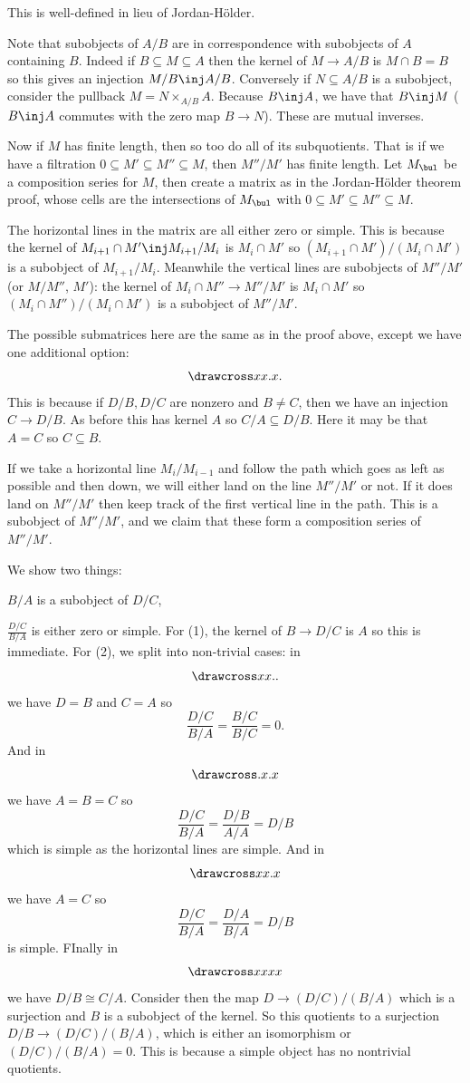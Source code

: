     This is well-defined in lieu of Jordan-H\"older.

\edefn


Note that subobjects of $A/B$ are in correspondence with subobjects of $A$ containing $B$.
Indeed if $B\subseteq M\subseteq A$ then the kernel of $M\to A/B$ is $M\cap B=B$ so this gives an injection $M/B\inj A/B$.
Conversely if $N\subseteq A/B$ is a subobject, consider the pullback $M=N\times_{A/B}A$.
Because $B\inj A$, we have that $B\inj M$ ($B\inj A$ commutes with the zero map $B\to N$).
These are mutual inverses.

Now if $M$ has finite length, then so too do all of its subquotients.
That is if we have a filtration $0\subseteq M'\subseteq M''\subseteq M$, then $M''/M'$ has finite length.
Let $M_\bul$ be a composition series for $M$, then create a matrix as in the Jordan-H\"older theorem proof, whose cells are the intersections of $M_\bul$ with $0\subseteq M'\subseteq M''\subseteq M$.

The horizontal lines in the matrix are all either zero or simple.
This is because the kernel of $M_{i+1}\cap M'\inj M_{i+1}/M_i$ is $M_i\cap M'$ so $(M_{i+1}\cap M')/(M_i\cap M')$ is a subobject of $M_{i+1}/M_i$.
Meanwhile the vertical lines are subobjects of $M''/M'$ (or $M/M''$, $M'$): the kernel of $M_i\cap M''\to M''/M'$ is $M_i\cap M'$ so $(M_i\cap M'')/(M_i\cap M')$ is a subobject of $M''/M'$.

The possible submatrices here are the same as in the proof above, except we have one additional option:
$$ \drawcross xx.x . $$
This is because if $D/B,D/C$ are nonzero and $B\neq C$, then we have an injection $C\to D/B$.
As before this has kernel $A$ so $C/A\subseteq D/B$.
Here it may be that $A=C$ so $C\subseteq B$.

If we take a horizontal line $M_i/M_{i-1}$ and follow the path which goes as left as possible and then down, we will either land on the line $M''/M'$ or not.
If it does land on $M''/M'$ then keep track of the first vertical line in the path.
This is a subobject of $M''/M'$, and we claim that these form a composition series of $M''/M'$.

We show two things:
\benum
    \item $B/A$ is a subobject of $D/C$,
    \item $\frac{D/C}{B/A}$ is either zero or simple.
\eenum
For (1), the kernel of $B\to D/C$ is $A$ so this is immediate.
For (2), we split into non-trivial cases: in
$$ \drawcross xx.. $$
we have $D=B$ and $C=A$ so
$$ \frac{D/C}{B/A} = \frac{B/C}{B/C} = 0 . $$
And in
$$ \drawcross .x.x $$
we have $A=B=C$ so
$$ \frac{D/C}{B/A} = \frac{D/B}{A/A} = D/B $$
which is simple as the horizontal lines are simple.
And in
$$ \drawcross xx.x $$
we have $A=C$ so
$$ \frac{D/C}{B/A} = \frac{D/A}{B/A} = D/B $$
is simple.
FInally in
$$ \drawcross xxxx $$
we have $D/B\cong C/A$.
Consider then the map $D\to(D/C)/(B/A)$ which is a surjection and $B$ is a subobject of the kernel.
So this quotients to a surjection $D/B\to(D/C)/(B/A)$, which is either an isomorphism or $(D/C)/(B/A)=0$.
This is because a simple object has no nontrivial quotients.

